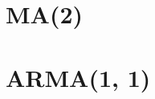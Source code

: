 \documentclass[11pt]{article}
\begin{document}
\section{MA(2)} %



\section{ARMA(1, 1)} %
\end{document}
